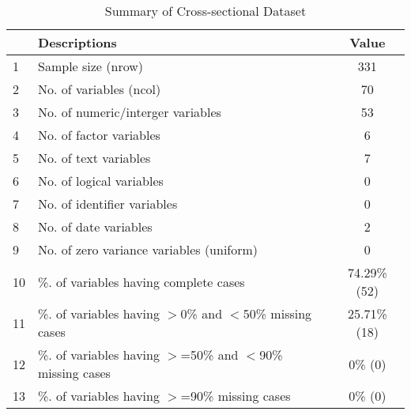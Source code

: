 \begin{table}[ht]
\centering
\caption{Summary of Cross-sectional Dataset} 
\begin{tabular}{llc}
  \hline
 & Descriptions & Value \\ 
  \hline
1 & Sample size (nrow) & 331 \\ 
  2 & No. of variables (ncol) & 70 \\ 
  3 & No. of numeric/interger variables & 53 \\ 
  4 & No. of factor variables & 6 \\ 
  5 & No. of text variables & 7 \\ 
  6 & No. of logical variables & 0 \\ 
  7 & No. of identifier variables & 0 \\ 
  8 & No. of date variables & 2 \\ 
  9 & No. of zero variance variables (uniform) & 0 \\ 
  10 & \%. of variables having complete cases & 74.29\% (52) \\ 
  11 & \%. of variables having $>$0\% and $<$50\% missing cases & 25.71\% (18) \\ 
  12 & \%. of variables having $>$=50\% and $<$90\% missing cases & 0\% (0) \\ 
  13 & \%. of variables having $>$=90\% missing cases & 0\% (0) \\ 
   \hline
\end{tabular}
\end{table}
